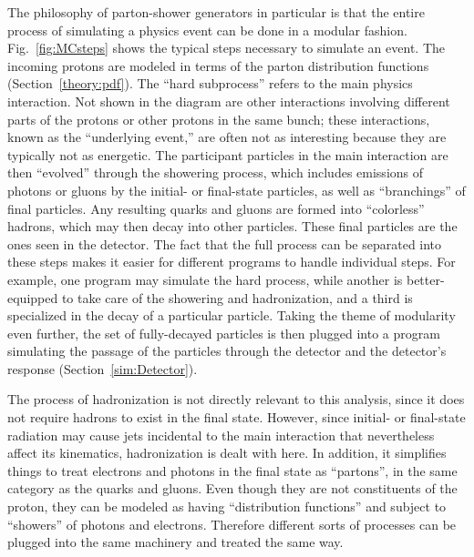 The philosophy of parton-shower generators 
in particular 
is that the entire process of simulating 
a physics event can be done in a modular fashion.  
Fig.~\ref{fig:MCsteps} 
shows the typical steps necessary to simulate an event.  
The incoming protons are modeled in terms of the 
parton distribution functions (Section~\ref{theory:pdf}).  
The ``hard subprocess'' refers to the main 
physics interaction.  
Not shown in the diagram are other interactions 
involving different parts of the protons 
or other protons in the same bunch; 
these interactions, known as the ``underlying event,''  
are often not as interesting 
because they are typically not as energetic.  
The participant particles in the main interaction 
are then ``evolved'' through the showering process, 
which includes emissions of photons or gluons 
by the initial- or final-state particles, 
as well as ``branchings'' of final particles. %
Any resulting quarks and gluons are 
formed into ``colorless'' hadrons, %
which may then decay into other particles. 
These final particles are the ones seen 
in the detector.  
The fact that the full process can be separated 
into these steps 
makes it easier for different programs 
to handle individual steps.  
For example, one program may simulate the 
hard process, 
while another is better-equipped to take care 
of the showering and hadronization, 
and a third is specialized in the decay of 
a particular particle.  
Taking the theme of modularity even further, 
the set of fully-decayed particles 
is then plugged into a program simulating 
the passage of the particles through the detector 
and the detector's response (Section~\ref{sim:Detector}).  

The process of hadronization is not directly 
relevant to this analysis, 
since it does not require hadrons to 
exist in the final state.  
However, since initial- or final-state radiation 
may cause jets incidental to the main interaction 
that nevertheless affect its kinematics, 
hadronization is dealt with here.  
In addition, it simplifies things to treat 
electrons and photons in the final state as ``partons'', 
in the same category as the quarks and gluons.  
Even though they are not constituents of the proton, 
they can be modeled as having 
``distribution functions'' 
and subject to ``showers'' of 
photons and electrons. 
Therefore different sorts of processes can be 
plugged into the same machinery and treated the same way.  

